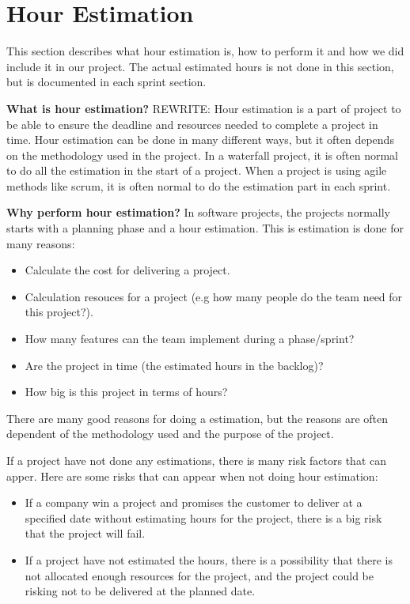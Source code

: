 \section{Hour Estimation}

	This section describes what hour estimation is, how to perform it and how we did 
	include it in our project. The actual estimated hours is not done in this section, 
	but is documented in each sprint section.

	{\bf What is hour estimation?} REWRITE: Hour estimation is a part of project to be able to ensure the 
	deadline and resources needed to complete a project in time.
	Hour estimation can be done in many different ways, but it often depends on the methodology
	used in the project. 
	In a waterfall project, it is often normal to do all the estimation in the start of a project.
	When a project is using agile methods like scrum, it is often normal to do the estimation part
	in each sprint. \cite{estimation}

	{\bf Why perform hour estimation?} In software projects, the projects normally starts with
	a planning phase and a hour estimation. This is estimation is done for many reasons:
		\begin{itemize}
			\item Calculate the cost for delivering a project.
			\item Calculation resouces for a project (e.g how many people do the team 
			need for this project?).
			\item How many features can the team implement during a phase/sprint?
			\item Are the project in time (the estimated hours in the backlog)?
			\item How big is this project in terms of hours?
		\end{itemize}
	There are many good reasons for doing a estimation, but the reasons are often dependent
	of the methodology used and the purpose of the project. 

	If a project have not done any estimations, there is many risk factors that can apper. 
	Here are some risks that can appear when not doing hour estimation:
	\begin{itemize}
		\item If a company win a project and promises the customer to deliver at a 
		specified date without estimating hours for the project, there is a big risk 
		that the project will fail.
		\item If a project have not estimated the hours, there is a possibility that 
		there is not allocated enough resources for the project, and the project could 
		be risking not to be delivered at the planned date.  
	\end{itemize}

